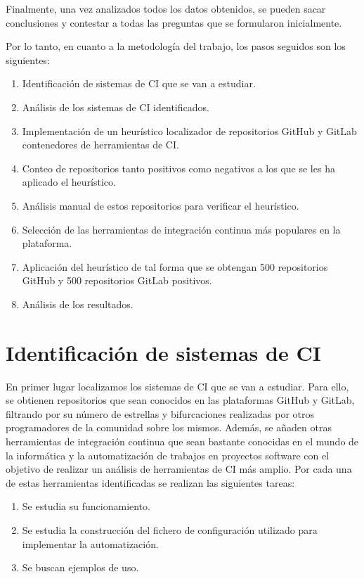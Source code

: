 Finalmente, una vez analizados todos los datos obtenidos, se pueden sacar conclusiones y contestar a todas las preguntas que se formularon inicialmente.
	
Por lo tanto, en cuanto a la metodología del trabajo, los pasos seguidos son los siguientes:
\begin{enumerate}
    \item Identificación de sistemas de CI que se van a estudiar.
    \item Análisis de los sistemas de CI identificados.
    \item Implementación de un heurístico localizador de repositorios GitHub y GitLab contenedores de herramientas de CI.
    \item Conteo de repositorios tanto positivos como negativos a los que se les ha aplicado el heurístico.
    \item Análisis manual de estos repositorios para verificar el heurístico.
    \item Selección de las herramientas de integración continua más populares en la plataforma.
    \item Aplicación del heurístico de tal forma que se obtengan 500 repositorios GitHub y 500 repositorios GitLab positivos.
    \item Análisis de los resultados.
\end{enumerate}

\section{Identificación de sistemas de CI}
En primer lugar localizamos los sistemas de CI que se van a estudiar. Para ello, se obtienen repositorios que sean conocidos en las plataformas GitHub y GitLab, filtrando por su número de estrellas y bifurcaciones realizadas por otros programadores de la comunidad sobre los mismos. Además, se añaden otras herramientas de integración continua que sean bastante conocidas en el mundo de la informática y la automatización de trabajos en proyectos software con el objetivo de realizar un análisis de herramientas de CI más amplio.
Por cada una de estas herramientas identificadas se realizan las siguientes tareas:
\begin{enumerate}
    \item Se estudia su funcionamiento.
    \item Se estudia la construcción del fichero de configuración utilizado para implementar la automatización.
    \item Se buscan ejemplos de uso.
\end{enumerate}

